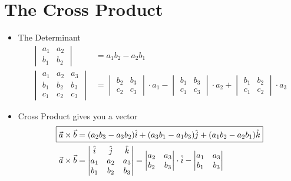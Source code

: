 \documentclass{article}
\begin{document}
\section{The Cross Product}
\begin{itemize}
  \item The Determinant
  \begin{align}
    \begin{vmatrix}
      a_1 & a_2 \\
      b_1 & b_2
    \end{vmatrix}
    &= a_1b_2-a_2b_1 \\
    \begin{vmatrix}
      a_1 & a_2 & a_3 \\
      b_1 & b_2 & b_3 \\
      c_1 & c_2 & c_3
    \end{vmatrix}
    &=
    \begin{vmatrix}
      b_2 & b_3 \\
      c_2 & c_3
    \end{vmatrix}
    \cdot a_1 -
    \begin{vmatrix}
      b_1 & b_3 \\
      c_1 & c_3
    \end{vmatrix}
    \cdot a_2 +
    \begin{vmatrix}
      b_1 & b_2 \\
      c_1 & c_2
    \end{vmatrix}
    \cdot a_3
  \end{align}
  \item Cross Product gives you a vector
  \begin{align}
    \Aboxed{
      \vec{a}\times\vec{b} &= (a_2b_3-a_3b_2)\hat{i} + (a_3b_1-a_1b_3)\hat{j} + (a_1b_2-a_2b_1)\hat{k}
    } \\
    \vec{a}\times\vec{b} &=
    \begin{vmatrix}
      \hat{i} & \hat{j} & \hat{k} \\
      a_1 & a_2 & a_3 \\
      b_1 & b_2 & b_3
    \end{vmatrix}
    =
    \begin{vmatrix}
      a_2 & a_3 \\
      b_2 & b_3
    \end{vmatrix}
    \cdot \hat{i} -
    \begin{vmatrix}
      a_1 & a_3 \\
      b_1 & b_3
    \end{vmatrix}

\end{align}
\end{itemize}
\end{document}
